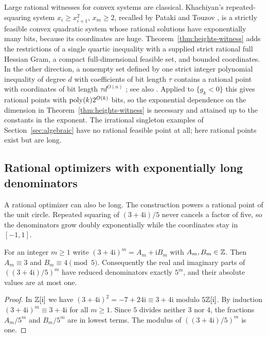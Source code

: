 Large rational witnesses for convex systems are classical. Khachiyan's
repeated-squaring system $x_i\ge x_{i+1}^2$, $x_m\ge2$, recalled by Pataki
and Touzov \cite{PatakiTouzov2024}, is a strictly feasible convex quadratic
system whose rational solutions have exponentially many bits, because its
coordinates are huge. Theorem~\ref{thm:heights-witness} adds the
restrictions of a single quartic inequality with a supplied strict rational
full Hessian Gram, a compact full-dimensional feasible set, and bounded
coordinates. In the other direction, a nonempty set defined by one strict
integer polynomial inequality of degree $d$ with coefficients of bit length
$\tau$ contains a rational point with coordinates of bit length
$\tau d^{O(n)}$ \cite[Theorem~4.1.2]{BasuPollackRoy1996}; see also
\cite[Proposition~2.5]{SafeyElDinZhi2010}. Applied to $\{g_k<0\}$ this gives
rational points with $\operatorname{poly}(k)2^{O(k)}$ bits, so the exponential dependence
on the dimension in Theorem~\ref{thm:heights-witness} is necessary and
attained up to the constants in the exponent. The irrational singleton
examples of Section~\ref{sec:algebraic} have no rational feasible point at
all; here rational points exist but are long.

\subsection{Rational optimizers with exponentially long denominators}
\label{sec:heights-rational}

A rational optimizer can also be long. The construction powers a rational
point of the unit circle. Repeated squaring of $(3+4\mathrm i)/5$ never
cancels a factor of five, so the denominators grow doubly exponentially
while the coordinates stay in $[-1,1]$.

\begin{lemma}
\label{lem:heights-circle-denominators}
For an integer $m\ge1$ write $(3+4\mathrm i)^m=A_m+\mathrm iB_m$ with
$A_m,B_m\in\mathbb Z$. Then $A_m\equiv3$ and $B_m\equiv4\pmod5$. Consequently the
real and imaginary parts of $((3+4\mathrm i)/5)^m$ have reduced denominators
exactly $5^m$, and their absolute values are at most one.
\end{lemma}

\begin{proof}
In $\mathbb Z[\mathrm i]$ we have $(3+4\mathrm i)^2=-7+24\mathrm i\equiv3+4\mathrm i$
modulo $5\mathbb Z[\mathrm i]$. By induction $(3+4\mathrm i)^m\equiv3+4\mathrm i$
for all $m\ge1$. Since $5$ divides neither $3$ nor $4$, the fractions
$A_m/5^m$ and $B_m/5^m$ are in lowest terms. The modulus of
$((3+4\mathrm i)/5)^m$ is one.
\end{proof}

